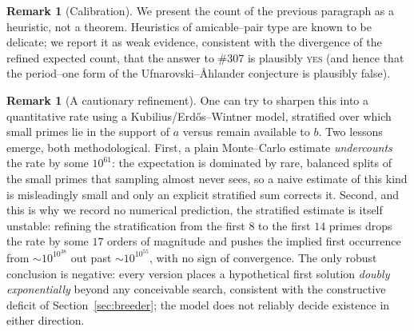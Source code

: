 \documentclass[11pt]{article}
\theoremstyle{definition}
\newtheorem{remark}[theorem]{Remark}
\begin{document}
\begin{remark}[Calibration]
We present the count of the previous paragraph as a heuristic, not a theorem. Heuristics of
amicable--pair type are known to be delicate; we report it as weak evidence, consistent with the
divergence of the refined expected count, that the answer to \#307 is plausibly \textsc{yes}
(and hence that the period--one form of the Ufnarovski--\AA hlander conjecture is plausibly false).
\end{remark}

\begin{remark}[A cautionary refinement]\label{rem:refined}
One can try to sharpen this into a quantitative rate using a Kubilius/Erd\H{o}s--Wintner model,
stratified over which small primes lie in the support of $a$ versus remain available to $b$. Two
lessons emerge, both methodological. First, a plain Monte--Carlo estimate \emph{undercounts} the rate
by some $10^{61}$: the expectation is dominated by rare, balanced splits of the small primes that
sampling almost never sees, so a naive estimate of this kind is misleadingly small and only an
explicit stratified sum corrects it. Second, and this is why we record no numerical prediction,
the stratified estimate is itself unstable: refining the stratification from the first $8$ to the
first $14$ primes drops the rate by some $17$ orders of magnitude and pushes the implied first
occurrence from $\sim10^{10^{38}}$ out past $\sim10^{10^{55}}$, with no sign of convergence. The only
robust conclusion is negative: every version places a hypothetical first solution \emph{doubly
exponentially} beyond any conceivable search, consistent with the constructive deficit of
Section~\ref{sec:breeder}; the model does not reliably decide existence in either direction.
\end{remark}
\end{document}
